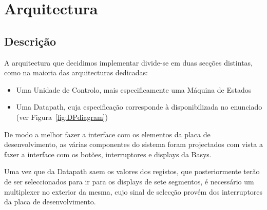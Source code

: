 \documentclass[a4paper]{article}
\begin{document}


\tableofcontents
\pagebreak

\section{Arquitectura}
\subsection{Descrição}
A arquitectura que decidimos implementar divide-se em duas secções distintas, como na maioria das arquitecturas dedicadas:
\begin{itemize}
\item Uma Unidade de Controlo, mais especificamente uma Máquina de Estados
\item Uma Datapath, cuja especificação corresponde à disponibilizada no enunciado (ver Figura~\ref{fig:DPdiagram})
\end{itemize}

De modo a melhor fazer a interface com os elementos da placa de desenvolvimento, as várias componentes do sistema foram projectados com vista a fazer a interface com os botões, interruptores e displays da Basys.

Uma vez que da Datapath saem os valores dos registos, que posteriormente terão de ser seleccionados para ir para os displays de sete segmentos, é necessário um multiplexer no exterior da mesma, cujo sinal de selecção provém dos interruptores da placa de desenvolvimento.

\pagebreak
\end{document}
